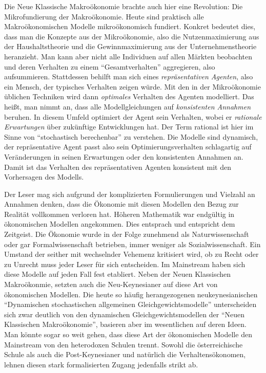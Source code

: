 \begin{enumerate}
	Die Neue Klassische Makroökonomie brachte auch hier eine Revolution: Die Mikrofundierung der Makroökonomie. Heute sind praktisch alle Makroökonomischen Modelle mikroökonomisch fundiert. Konkret bedeutet dies, dass man die Konzepte aus der Mikroökonomie, also die Nutzenmaximierung aus der Haushaltstheorie und die Gewinnmaximierung aus der Unternehmenstheorie heranzieht. Man kann aber nicht alle Individuen auf allen Märkten beobachten und deren Verhalten zu einem "`Gesamtverhalten"' aggregieren, also aufsummieren. Stattdessen behilft man sich eines \textit{repräsentativen Agenten}, also ein Mensch, der typisches Verhalten zeigen würde.	Mit den in der Mikroökonomie üblichen Techniken wird dann \textit{optimales} Verhalten des Agenten modelliert. Das heißt, man nimmt an, dass alle Modellgleichungen auf \textit{konsistenten Annahmen} beruhen. In diesem Umfeld optimiert der Agent sein Verhalten, wobei er \textit{rationale Erwartungen} über zukünftige Entwicklungen hat. Der Term rational ist hier im Sinne von "`stochastisch berechenbar"' zu verstehen. Die Modelle sind dynamisch, der repräsentative Agent passt also sein Optimierungsverhalten schlagartig auf Veränderungen in seinen Erwartungen oder den konsistenten Annahmen an. Damit ist das Verhalten des repräsentativen Agenten konsistent mit den Vorhersagen des Modells. 
	
	Der Leser mag sich aufgrund der komplizierten Formulierungen und Vielzahl an Annahmen denken, dass die Ökonomie mit diesen Modellen den Bezug zur Realität vollkommen verloren hat. Höheren Mathematik war endgültig in ökonomischen Modellen angekommen. Dies entsprach und entspricht dem Zeitgeist. Die Ökonomie wurde in der Folge zunehmend als Naturwissenschaft oder gar Formalwissenschaft betrieben, immer weniger als Sozialwissenschaft. Ein Umstand der seither mit wechselnder Vehemenz kritisiert wird, ob zu Recht oder zu Unrecht muss jeder Leser für sich entscheiden. Im Mainstream haben sich diese Modelle auf jeden Fall fest etabliert. Neben der Neuen Klassischen Makroökonmie, setzten auch die Neu-Keynesianer auf diese Art von ökonomischen Modellen. Die heute so häufig herangezogenen neukeynesianischen "`Dynamischen stochastischen allgemeinen Gleichgewichtsmodelle"' unterscheiden sich zwar deutlich von den dynamischen Gleichgewichtsmodellen der "`Neuen Klassischen Makroökonomie"', basieren aber im wesentlichen auf deren Ideen.  
	Man könnte sogar so weit gehen, dass diese Art der ökonomischen Modelle den Mainstream von den heterodoxen Schulen trennt. Sowohl die österreichische Schule als auch die Post-Keynesianer und natürlich die Verhaltensökonomen, lehnen diesen stark formalisierten Zugang jedenfalls strikt ab.


\end{enumerate}	


